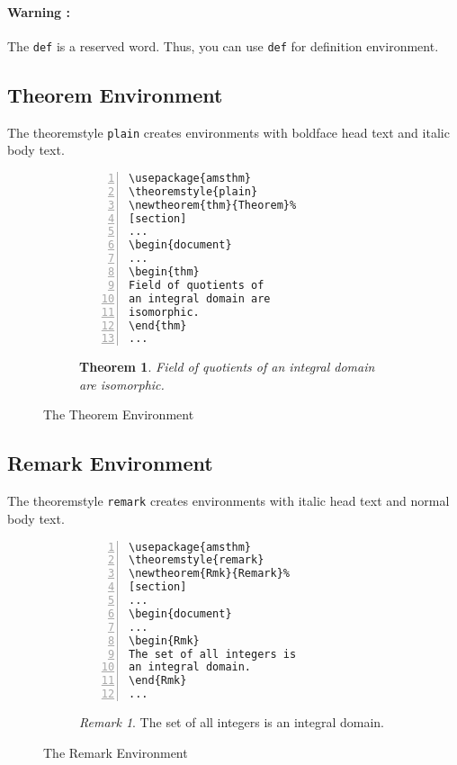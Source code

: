 \documentclass{article}
\newtheorem{thm}{Theorem}[section]
\theoremstyle{definition}
\theoremstyle{remark}
\newtheorem{Rmk}{Remark}[section]
\begin{document}
\paragraph{Warning :}
	The \texttt{def} is a reserved word. Thus, you can use \texttt{def} for definition environment.

\subsection{Theorem Environment}
	The theoremstyle \texttt{plain} creates environments with boldface head text and italic body text.
\begin{figure}[h]
\centering
\begin{subfigure}{0.45\textwidth}
\begin{Verbatim}[numbers = left]
\usepackage{amsthm}
\theoremstyle{plain}
\newtheorem{thm}{Theorem}%
[section]
...
\begin{document}
...
\begin{thm}
Field of quotients of
an integral domain are
isomorphic.
\end{thm}
...
\end{Verbatim}
\end{subfigure}
\begin{subfigure}{0.45\textwidth}
\begin{thm}
Field of quotients of
an integral domain are
isomorphic.
\end{thm}
\end{subfigure} 
\caption{The Theorem Environment}
\label{fig:thmEnvironment}
\end{figure}

\subsection{Remark Environment}
	The theoremstyle \texttt{remark} creates environments with italic head text and normal body text.
\begin{figure}[h]
\centering
\begin{subfigure}{0.45\textwidth}
\begin{Verbatim}[numbers = left]
\usepackage{amsthm}
\theoremstyle{remark}
\newtheorem{Rmk}{Remark}%
[section]
...
\begin{document}
...
\begin{Rmk}
The set of all integers is
an integral domain.
\end{Rmk}
...
\end{Verbatim}
\end{subfigure}
\begin{subfigure}{0.45\textwidth}
\begin{Rmk}
The set of all integers is
an integral domain.
\end{Rmk}
\end{subfigure} 
\caption{The Remark Environment}
\label{fig:rmkEnvironment}
\end{figure}
\end{document}
